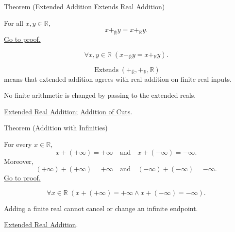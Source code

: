 \begin{theorembox}{Theorem (Extended Addition Extends Real Addition)}
\begin{theorem}
\label{thm:extended-real-addition-extends-real-addition}
For all $x,y\in\mathbb{R}$,
\[
x+_{\overline{\mathbb{R}}}y=x+_{\mathbb{R}}y.
\]
\hyperref[prf:extended-real-addition-extends-real-addition]{Go to proof.}
\end{theorem}
\end{theorembox}
\begin{remark*}
\[
\forall x,y\in\mathbb{R}\;(x+_{\overline{\mathbb{R}}}y=x+_{\mathbb{R}}y).
\]
\end{remark*}
\begin{remark*}
\[
\operatorname{Extends}(+_{\overline{\mathbb{R}}},+_{\mathbb{R}},\mathbb{R})
\]
means that extended addition agrees with real addition on finite real inputs.
\end{remark*}
\begin{remark*}[Interpretation]
No finite arithmetic is changed by passing to the extended reals.
\end{remark*}
\begin{dependencies}
\hyperref[def:extended-real-addition]{Extended Real Addition};
\hyperref[def:addition-on-r]{Addition of Cuts}.
\end{dependencies}

\begin{theorembox}{Theorem (Addition with Infinities)}
\begin{theorem}
\label{thm:extended-real-addition-with-infinities}
For every $x\in\mathbb{R}$,
\[
x+(+\infty)=+\infty
\quad\text{and}\quad
x+(-\infty)=-\infty.
\]
Moreover,
\[
(+\infty)+(+\infty)=+\infty
\quad\text{and}\quad
(-\infty)+(-\infty)=-\infty.
\]
\hyperref[prf:extended-real-addition-with-infinities]{Go to proof.}
\end{theorem}
\end{theorembox}
\begin{remark*}
\[
\forall x\in\mathbb{R}\;(x+(+\infty)=+\infty\land x+(-\infty)=-\infty).
\]
\end{remark*}
\begin{remark*}[Interpretation]
Adding a finite real cannot cancel or change an infinite endpoint.
\end{remark*}
\begin{dependencies}
\hyperref[def:extended-real-addition]{Extended Real Addition}.
\end{dependencies}


